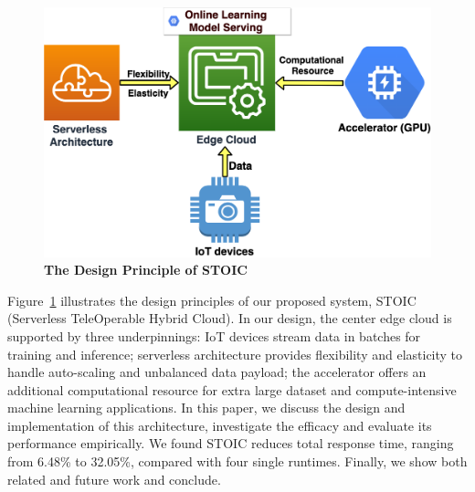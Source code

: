 \begin{figure}
    \centering
    \includegraphics[scale=0.25]{figures/edge}
    \caption{\textbf{The Design Principle of STOIC}}
    \label{fig:edge}
\end{figure}

Figure~\ref{fig:edge} illustrates the design principles of our proposed system, STOIC (Serverless TeleOperable Hybrid Cloud). In our design, the center edge cloud is supported by three underpinnings: IoT devices stream data in batches for training and inference; serverless architecture provides flexibility and elasticity to handle auto-scaling and unbalanced data payload; the accelerator offers an additional computational resource for extra large dataset and compute-intensive machine learning applications. In this paper, we discuss the design and implementation of this architecture, investigate the efficacy and evaluate its performance empirically. We found STOIC reduces total response time, ranging from 6.48\% to 32.05\%, compared with four single runtimes. Finally, we show both related and future work and conclude.
